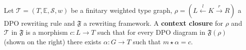 \begin{definition}
    \label{def:context_closure}  
    \ \newline 
\begin{minipage}{0.65\textwidth}
    Let $\mathcal{T}=(T,\mathbb{E},\mathcal{S},w)$ be a finitary weighted type graph, \(\rho = (L \overset{l}{\leftarrow} K \overset{r}{\rightarrow} R ) \) a DPO rewriting rule and $\mathfrak{F}$ a rewriting framework. 
    A \textbf{context closure} for $\rho$ and $\mathcal{T}$ in $\mathfrak{F}$ is a morphism $c:L \rightarrow T$ such that for every DPO diagram in $\mathfrak{F}(\rho)$ (shown on the right) 
    there exists $\alpha : G \rightarrow T$ such that $m \star \alpha = c$.
\end{minipage}
\begin{minipage}{0.35\textwidth}
    \begin{center}
      \end{center}
\end{minipage}
\end{definition}
